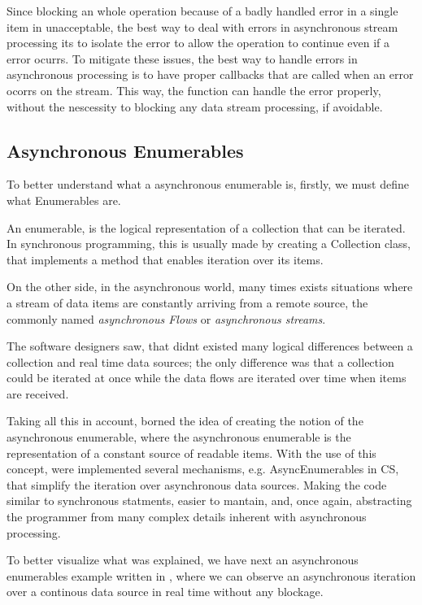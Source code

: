 	 Since blocking an whole operation because of a badly handled error in a single item in unacceptable, the best way to deal with errors in asynchronous stream processing its to isolate the error to allow the operation to continue even if a error ocurrs.
	 To mitigate these issues, the best way to handle errors in asynchronous processing is to have proper callbacks that are called when an error ocorrs on the stream. This way, the function can handle the error properly, without the nescessity to blocking any data stream processing, if avoidable.
	 
	

	\subsection{Asynchronous Enumerables}
	To better understand what a asynchronous enumerable is, firstly, we must define what Enumerables are. 
	
	An enumerable, is the logical representation of a collection that can be iterated. 
	In synchronous programming, this is usually made by creating a Collection class, that implements a method that enables iteration over its items.
	
	On the other side, in the asynchronous world, many times exists situations where a stream of data items are constantly arriving from a remote source, the commonly named \textit{asynchronous Flows} or \textit{asynchronous streams}. 
	
	The software designers saw, that didnt existed many logical differences between a collection and real time data sources; 
	the only difference was that a collection could be iterated at once while the data flows are iterated over time when items are received.

	Taking all this in account, borned the idea of creating the notion of the asynchronous enumerable, where the asynchronous enumerable is the representation of a constant source of readable items.
	With the use of this concept, were implemented several mechanisms, e.g. AsyncEnumerables in CS, that simplify the iteration over asynchronous data sources. 
	Making the code similar to synchronous statments, easier to mantain, and, once again, abstracting the programmer from many complex details inherent with asynchronous processing.
	

	To better visualize what was explained, we have next an asynchronous enumerables example written in , where we can observe an asynchronous iteration over a continous data source in real time without any blockage.
	\clearpage


